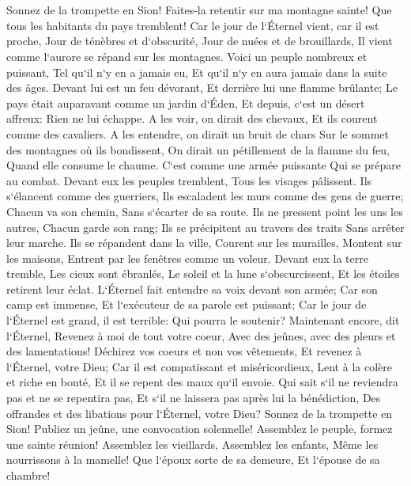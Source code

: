 \chapter{}

\verse Sonnez de la trompette en Sion! Faites-la retentir sur ma montagne sainte! Que tous les habitants du pays tremblent! Car le jour de l`Éternel vient, car il est proche, 
\verse Jour de ténèbres et d`obscurité, Jour de nuées et de brouillards, Il vient comme l`aurore se répand sur les montagnes. Voici un peuple nombreux et puissant, Tel qu`il n`y en a jamais eu, Et qu`il n`y en aura jamais dans la suite des âges. 
\verse Devant lui est un feu dévorant, Et derrière lui une flamme brûlante; Le pays était auparavant comme un jardin d`Éden, Et depuis, c`est un désert affreux: Rien ne lui échappe. 
\verse A les voir, on dirait des chevaux, Et ils courent comme des cavaliers. 
\verse A les entendre, on dirait un bruit de chars Sur le sommet des montagnes où ils bondissent, On dirait un pétillement de la flamme du feu, Quand elle consume le chaume. C`est comme une armée puissante Qui se prépare au combat. 
\verse Devant eux les peuples tremblent, Tous les visages pâlissent. 
\verse Ils s`élancent comme des guerriers, Ils escaladent les murs comme des gens de guerre; Chacun va son chemin, Sans s`écarter de sa route. 
\verse Ils ne pressent point les uns les autres, Chacun garde son rang; Ils se précipitent au travers des traits Sans arrêter leur marche. 
\verse Ils se répandent dans la ville, Courent sur les murailles, Montent sur les maisons, Entrent par les fenêtres comme un voleur. 
\verse Devant eux la terre tremble, Les cieux sont ébranlés, Le soleil et la lune s`obscurcissent, Et les étoiles retirent leur éclat. 
\verse L`Éternel fait entendre sa voix devant son armée; Car son camp est immense, Et l`exécuteur de sa parole est puissant; Car le jour de l`Éternel est grand, il est terrible: Qui pourra le soutenir? 
\verse Maintenant encore, dit l`Éternel, Revenez à moi de tout votre coeur, Avec des jeûnes, avec des pleurs et des lamentations! 
\verse Déchirez vos coeurs et non vos vêtements, Et revenez à l`Éternel, votre Dieu; Car il est compatissant et miséricordieux, Lent à la colère et riche en bonté, Et il se repent des maux qu`il envoie. 
\verse Qui sait s`il ne reviendra pas et ne se repentira pas, Et s`il ne laissera pas après lui la bénédiction, Des offrandes et des libations pour l`Éternel, votre Dieu? 
\verse Sonnez de la trompette en Sion! Publiez un jeûne, une convocation solennelle! 
\verse Assemblez le peuple, formez une sainte réunion! Assemblez les vieillards, Assemblez les enfants, Même les nourrissons à la mamelle! Que l`époux sorte de sa demeure, Et l`épouse de sa chambre! 
